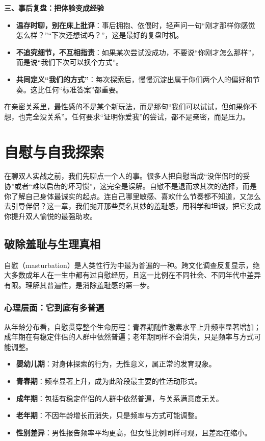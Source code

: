 \documentclass[12pt,UTF8]{ctexbook}
\begin{document}
\textbf{三、事后复盘：把体验变成经验}

\begin{itemize}
\item \textbf{温存时聊，别在床上批评}：事后拥抱、依偎时，轻声问一句“刚才那样你感觉怎么样？”“下次还想试吗？”，这是最好的复盘时机。
\item \textbf{不追究细节，不互相指责}：如果某次尝试没成功，不要说“你刚才怎么那样”，而是说“我们下次可以换个方式”。
\item \textbf{共同定义“我们的方式”}：每次探索后，慢慢沉淀出属于你们两个人的偏好和节奏。这比任何“标准答案”都重要。
\end{itemize}

\begin{tcolorbox}[colback=pink!5!white,colframe=red!50!black,title=贴心小叮咛]
在亲密关系里，最性感的不是某个新玩法，而是那句“我们可以试试，但如果你不想，也完全没关系”。任何要求“证明你爱我”的尝试，都不是亲密，而是压力。
\end{tcolorbox}

\chapter{自慰与自我探索}

在聊双人实战之前，我们先聊点一个人的事。很多人把自慰当成“没伴侣时的妥协”或者“难以启齿的坏习惯”，这完全是误解。自慰不是退而求其次的选择，而是你了解自己身体最诚实的起点。连自己哪里敏感、喜欢什么节奏都不知道，又怎么去引导伴侣？这一章，我们抛开那些莫名其妙的羞耻感，用科学和坦诚，把它变成你提升双人愉悦的最强助攻。

\section{破除羞耻与生理真相}

自慰（masturbation）是人类性行为中最为普遍的一种。跨文化调查反复显示，绝大多数成年人在一生中都有过自慰经历，且这一比例在不同社会、不同年代中差异有限。理解其普遍性，是消除羞耻感的第一步。

\subsection{心理层面：它到底有多普遍}

从年龄分布看，自慰贯穿整个生命历程：青春期随性激素水平上升频率显著增加；成年期在有稳定伴侣的人群中依然普遍；老年期同样不会消失，只是频率与方式可能调整。

\begin{itemize}
\item \textbf{婴幼儿期}：对身体探索的行为，无性意义，属正常的发育现象。
\item \textbf{青春期}：频率显著上升，成为此阶段最主要的性活动形式。
\item \textbf{成年期}：包括有稳定伴侣的人群中依然普遍，与关系满意度无关。
\item \textbf{老年期}：不因年龄增长而消失，只是频率与方式可能调整。
\item \textbf{性别差异}：男性报告频率平均更高，但女性比例同样可观，且差距在缩小。
\end{itemize}
\end{document}

